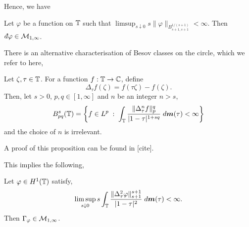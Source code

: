 Hence, we have
\begin{proposition}
    Let $\varphi$ be a function on $\mathbb{T}$ such that $\limsup_{s \downarrow 0} s\|\varphi\|_{B_{s+1,s+1}^{1/(s+1)}} < \infty$.
    Then $\qd \varphi \in \M_{1,\infty}$.
\end{proposition}


There is an alternative characterisation of Besov
classes on the circle, which we refer to here,
\begin{proposition}
    Let $\zeta,\tau \in \mathbb{T}$. For a function
    $f:\mathbb{T}\to\mathbb{C}$, define
    \begin{equation}
        \Delta_\tau f(\zeta) = f(\tau\zeta)-f(\zeta).
    \end{equation}
    Then, let $s > 0$, $p,q \in [1,\infty]$ and $n$ be an integer $n > s$,
    \begin{equation}
        B_{pq}^s(\mathbb{T}) = \left\{f \in L^p\;:\;\int_{\mathbb{T}} \frac{\|\Delta^n_\tau f\|_p^q}{|1-\tau|^{1+sq}}\;d\boldsymbol{m}(\tau) < \infty\right\}
    \end{equation}
    and the choice of $n$ is irrelevant.
\end{proposition}
A proof of this proposition can be found in [cite].

This implies the following,
\begin{proposition}
    Let $\varphi \in H^1(\mathbb{T})$ satisfy,
    \begin{equation}
        \limsup_{s\downarrow 0} s\int_{\mathbb{T}}\frac{\|\Delta^2_\tau \varphi\|_{s+1}^{s+1}}{|1-\tau|^2}\;d\boldsymbol{m}(\tau) < \infty.
    \end{equation}
    Then $\Gamma_\varphi \in \mathcal{M}_{1,\infty}$.
\end{proposition}



